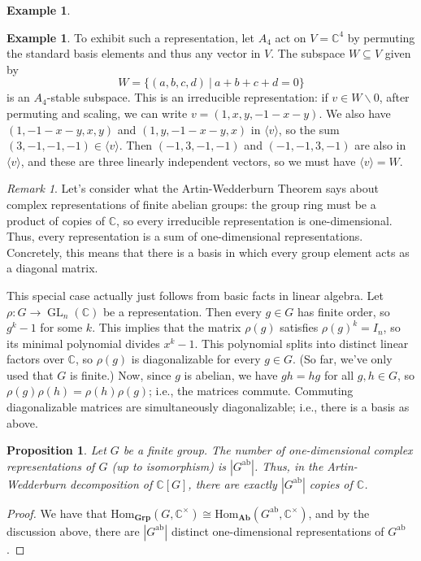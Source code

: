 \documentclass{amsart}[12pt]
\newcommand{\Hom}{\mathrm{Hom}}
\newcommand{\C}{\mathbb{C}}
\numberwithin{equation}{section}
\theoremstyle{plain} %
\newtheorem{prop}[equation]{Proposition}
\theoremstyle{definition}
\newtheorem{ex}[equation]{Example}
\theoremstyle{remark}
\newtheorem{rem}[equation]{Remark}
\newcommand{\GL}{\operatorname{GL}}
\newcommand{\Grp}{\mathbf{Grp}}
\newcommand{\Ab}{\mathbf{Ab}}
\begin{document}
\begin{ex}
\begin{ex}
To exhibit such a representation, let $A_4$ act on $V=\C^4$ by permuting the standard basis elements and thus any vector in $V$. The subspace $W\subseteq V$ given by
\[ W = \{ (a,b,c,d) \ | \ a+b+c+d=0\}\]
is an $A_4$-stable subspace. This is an irreducible representation: if $v\in W\smallsetminus 0$, after permuting and scaling, we can write $v=(1,x,y,-1-x-y)$. We also have $(1,-1-x-y,x,y)$ and $(1,y,-1-x-y,x)$ in $\langle v \rangle$, so the sum $(3,-1,-1,-1)\in \langle v \rangle$. Then $(-1,3,-1,-1)$ and $(-1,-1,3,-1)$ are also in $\langle v \rangle$, and these are three linearly independent vectors, so we must have $\langle v \rangle=W$.
\end{ex}

\begin{rem} Let's consider what the Artin-Wedderburn Theorem says about complex representations of finite abelian groups: the group ring must be a product of copies of $\C$, so every irreducible representation is one-dimensional. Thus, every representation is a sum of one-dimensional representations. Concretely, this means that there is a basis in which every group element acts as a diagonal matrix.

This special case actually just follows from basic facts in linear algebra. Let $\rho:G\to \GL_n(\C)$ be a representation. Then every $g\in G$ has finite order, so $g^k-1$ for some $k$. This implies that the matrix $\rho(g)$ satisfies $\rho(g)^k = I_n$, so its minimal polynomial divides $x^k-1$. This polynomial splits into distinct linear factors over $\C$, so $\rho(g)$ is diagonalizable for every $g\in G$. (So far, we've only used that $G$ is finite.) Now, since $g$ is abelian, we have $gh=hg$ for all $g,h\in G$, so $\rho(g) \rho(h) = \rho(h) \rho(g)$; i.e., the matrices commute. Commuting diagonalizable matrices are simultaneously diagonalizable; i.e., there is a basis as above.
\end{rem}



\begin{prop} Let $G$ be a finite group. The number of one-dimensional complex representations of $G$ (up to isomorphism) is $|G^{\mathrm{ab}}|$. Thus, in the Artin-Wedderburn decomposition of $\C[G]$, there are exactly $|G^{\mathrm{ab}}|$ copies of $\C$.
\end{prop}
\begin{proof}
We have that $\Hom_{\Grp}(G,\C^\times) \cong \Hom_{\Ab}(G^{\mathrm{ab}},\C^\times)$, and by the discussion above, there are $|G^{\mathrm{ab}}|$ distinct one-dimensional representations of $G^{\mathrm{ab}}$.
\end{proof}


\end{ex}
\end{document}
